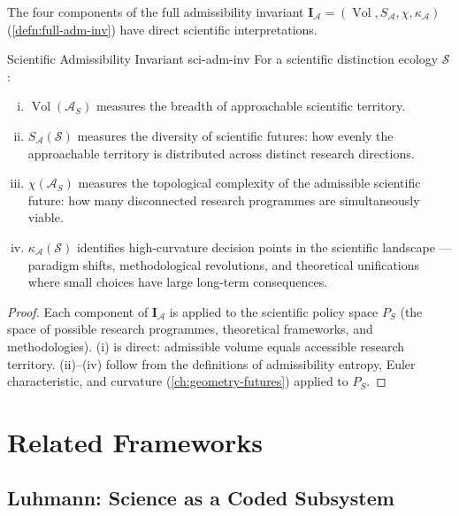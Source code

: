 \documentclass[12pt,twoside,openright]{book}
\newcommand{\adm}{\mathcal{A}}
\newcommand{\Vol}{\operatorname{Vol}}
\begin{document}
The four components of the full admissibility invariant
$\mathbf{I}_\adm = (\Vol, S_\adm, \chi, \kappa_\adm)$
(\cref{defn:full-adm-inv}) have direct scientific
interpretations.

\begin{proposition}{Scientific Admissibility Invariant}%
  {sci-adm-inv}
  For a scientific distinction ecology $\mathcal{S}$:
  \begin{enumerate}[(i)]
    \item $\Vol(\adm_S)$ measures the breadth of
          approachable scientific territory.
    \item $S_\adm(\mathcal{S})$ measures the diversity
          of scientific futures: how evenly the
          approachable territory is distributed across
          distinct research directions.
    \item $\chi(\adm_S)$ measures the topological
          complexity of the admissible scientific future:
          how many disconnected research programmes
          are simultaneously viable.
    \item $\kappa_\adm(\mathcal{S})$ identifies
          high-curvature decision points in the
          scientific landscape — paradigm shifts,
          methodological revolutions, and theoretical
          unifications where small choices have
          large long-term consequences.
  \end{enumerate}
\end{proposition}

\begin{proof}
  Each component of $\mathbf{I}_\adm$ is applied to
  the scientific policy space $P_S$ (the space of
  possible research programmes, theoretical frameworks,
  and methodologies).
  (i) is direct: admissible volume equals accessible
  research territory.
  (ii)--(iv) follow from the definitions of
  admissibility entropy, Euler characteristic, and
  curvature (\cref{ch:geometry-futures}) applied to $P_S$.
\end{proof}

\section{Related Frameworks}
\label{sec:ch29-related-frameworks}

\subsection*{Luhmann: Science as a Coded Subsystem}
\end{document}
